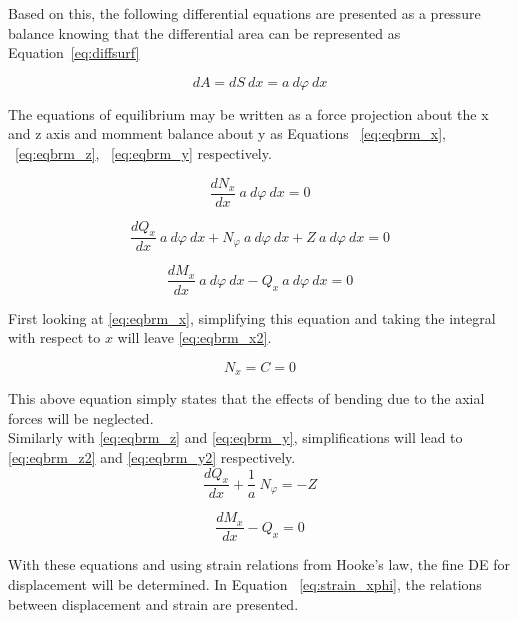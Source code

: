 Based on this, the following differential equations are presented as a pressure balance knowing that the differential area can be represented as Equation~\ref{eq:diffsurf}
 
\begin{equation}
	\label{eq:diffsurf}
	dA = dS\ dx = a\ d\varphi \ dx   
\end{equation}

The equations of equilibrium may be written as a force projection about the x and z axis and momment balance about y as Equations ~\ref{eq:eqbrm_x}, ~\ref{eq:eqbrm_z}, ~\ref{eq:eqbrm_y} respectively.

\begin{equation}
	\label{eq:eqbrm_x}
	\frac{dN_x}{dx}\ a\ d\varphi \ dx = 0
\end{equation}

\begin{equation}
	\label{eq:eqbrm_z}
	\frac{dQ_x}{dx}\ a\ d\varphi \ dx+ N_\varphi \ a\ d\varphi \ dx +Z\ a\ d\varphi \ dx= 0
\end{equation}

\begin{equation}
	\label{eq:eqbrm_y}
	\frac{dM_x}{dx}\ a\ d\varphi \ dx- Q_x\ a\ d\varphi \ dx= 0
\end{equation}

First looking at \ref{eq:eqbrm_x}, simplifying this equation and taking the integral with respect to $x$ will leave \ref{eq:eqbrm_x2}. 

\begin{equation}
	\label{eq:eqbrm_x2}
	N_x = C = 0 
\end{equation}

This above equation simply states that the effects of bending due to the axial forces will be neglected.\\

Similarly with \ref{eq:eqbrm_z} and \ref{eq:eqbrm_y}, simplifications will lead to \ref{eq:eqbrm_z2} and \ref{eq:eqbrm_y2} respectively.
\begin{equation}
	\label{eq:eqbrm_z2}
	\frac{dQ_x}{dx}+\frac{1}{a}\ N_\varphi = -Z
\end{equation}

\begin{equation}
	\label{eq:eqbrm_y2}
	\frac{dM_x}{dx}- Q_x= 0
\end{equation} 

With these equations and using strain relations from Hooke's law, the fine DE for displacement will be determined. In Equation ~\ref{eq:strain_xphi}, the relations between displacement and strain are presented.

